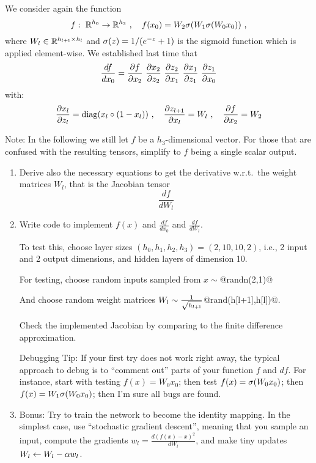 

\renewcommand{\course}{Maths for Intelligent Systems}
\renewcommand{\coursedate}{Summer 2019}

\renewcommand{\exnum}{Exercise 5}

\exercises


\exercisestitle



We consider again the function
$$f:~ {\mathbb{R}}^{h_0} \to {\mathbb{R}}^{h_3} ~,\quad f(x_0) = W_2 \sigma( W_1 \sigma( W_0 x_0 )
) ~,$$ where $W_l \in{\mathbb{R}}^{h_{l{{\hspace*{-.0pt}\text{\rm +}\hspace*{-.5pt}}1}}\times h_l}$ and $\sigma(z) = 1/(e^{-z}+1)$ is the sigmoid function which is applied element-wise. We established last time that
$$\frac{d f}{d x_0}
= \frac{\partial f}{\partial x_2}~
  \frac{\partial x_2}{\partial z_2}~ \frac{\partial z_2}{\partial x_1}~
  \frac{\partial x_1}{\partial z_1}~ \frac{\partial z_1}{\partial x_0} $$
with:
$$
\frac{\partial x_l}{\partial z_l} = {\rm diag}( x_l \circ (1-x_l) ) ~,\quad
\frac{\partial z_{l{{\hspace*{-.0pt}\text{\rm +}\hspace*{-.5pt}}1}}}{\partial x_l} = W_l ~,\quad
\frac{\partial f}{\partial x_2}  = W_2
$$

Note: In the following we still let $f$ be a $h_3$-dimensional vector. For those that are confused with the resulting tensors, simplify to $f$ being a single scalar output.

\begin{enumerate}

\item Derive also the necessary equations to get the derivative w.r.t.\ the weight matrices $W_l$, that is the Jacobian tensor
$$\frac{d f}{d W_l}$$



\item Write code to implement $f(x)$ and $\frac{d f}{d x_0}$ and $\frac{d f}{d W_l}$.

To test this, choose layer sizes $(h_0, h_1, h_2, h_3) = (2, 10, 10, 2)$, i.e., 2 input and 2 output dimensions, and hidden layers of dimension 10.

For testing, choose random inputs sampled from $x\sim$@randn(2,1)@

And choose random weight matrices $W_l\sim\frac{1}{\sqrt{h_{l{{\hspace*{-.0pt}\text{\rm +}\hspace*{-.5pt}}1}}}}$@rand(h[l+1],h[l])@. 

Check the implemented Jacobian by comparing to the finite difference
approximation.

Debugging Tip: If your first try does not work right away, the typical
approach to debug is to ``comment out'' parts of your function $f$ and
$df$. For instance, start with testing $f(x) = W_0 x_0$; then test
$f(x) = \sigma(W_0 x_0)$; then $f(x) = W_1 \sigma(W_0 x_0)$; then I'm sure all
bugs are found.

\item Bonus: Try to train the network to become the identity mapping. In the simplest case, use ``stochastic gradient descent'', meaning that you sample an input, compute the gradients $w_l = \frac{d (f(x)-x)^2}{d W_l}$, and make tiny updates $W_l \gets W_l - \alpha w_l$.

\end{enumerate}

